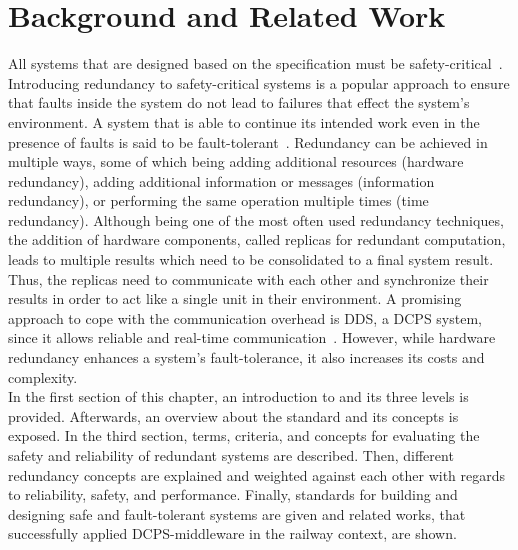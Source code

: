  \chapter{Background and Related Work}
\label{chptr:concepts}

All systems that are designed based on the  specification must be safety-critical~\cite{OnBoardUnitSafetyTesting}. 
Introducing redundancy to safety-critical systems is a popular approach to ensure that faults inside the system do not lead to failures that effect the system's environment.
A system that is able to continue its intended work even in the presence of faults is said to be fault-tolerant~\cite{BarryFaultToleranceAnalysis}.
Redundancy can be achieved in multiple ways, some of which being adding additional resources (hardware redundancy), adding additional information or messages (information redundancy), or performing the same operation multiple times (time redundancy).
Although being one of the most often used redundancy techniques, the addition of hardware components, called replicas for redundant computation, leads to multiple results which need to be consolidated to a final system result.
Thus, the replicas need to communicate with each other and synchronize their results in order to act like a single unit in their environment.
A promising approach to cope with the communication overhead is \gls*{DDS}, a \gls*{DCPS} system, since it allows reliable and real-time communication~\cite{omgDDSspec}.
However, while hardware redundancy enhances a system's fault-tolerance, it also increases its costs and complexity.
\\

In the first section of this chapter, an introduction to  and its three levels is provided.
Afterwards, an overview about the  standard and its concepts is exposed.
In the third section, terms, criteria, and concepts for evaluating the safety and reliability of redundant systems are described.
Then, different redundancy concepts are explained and weighted against each other with regards to reliability, safety, and performance.
Finally, standards for building and designing safe and fault-tolerant systems are given and related works, that successfully applied \gls*{DCPS}-middleware in the railway context, are shown.

